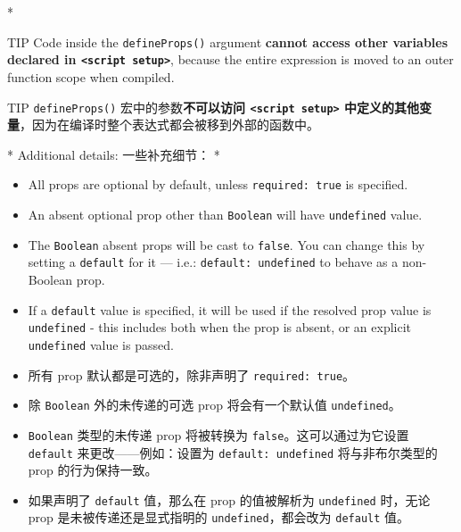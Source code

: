 \begin{paracol}{2}

\switchcolumn[0]*%
\begin{vueQuote}{TIP}
Code inside the \texttt{defineProps()} argument \textbf{cannot access
other variables declared in
\texttt{\textless{}script\ setup\textgreater{}}}, because the entire
expression is moved to an outer function scope when compiled.
\end{vueQuote}
\switchcolumn
\begin{vueQuote}{TIP}
\texttt{defineProps()} 宏中的参数\textbf{不可以访问
\texttt{\textless{}script\ setup\textgreater{}}
中定义的其他变量}，因为在编译时整个表达式都会被移到外部的函数中。
\end{vueQuote}
\switchcolumn[0]*%
Additional details:
\switchcolumn
一些补充细节：
\switchcolumn[0]*%
\begin{itemize}
\item
    All props are optional by default, unless \texttt{required:\ true} is
    specified.
\item
    An absent optional prop other than \texttt{Boolean} will have
    \texttt{undefined} value.
\item
    The \texttt{Boolean} absent props will be cast to \texttt{false}. You
    can change this by setting a \texttt{default} for it --- i.e.:
    \texttt{default:\ undefined} to behave as a non-Boolean prop.
\item
    If a \texttt{default} value is specified, it will be used if the
    resolved prop value is \texttt{undefined} - this includes both when
    the prop is absent, or an explicit \texttt{undefined} value is passed.
\end{itemize}
\switchcolumn
\begin{itemize}
\item
    所有 prop 默认都是可选的，除非声明了 \texttt{required:\ true}。
\item
    除 \texttt{Boolean} 外的未传递的可选 prop 将会有一个默认值
    \texttt{undefined}。
\item
    \texttt{Boolean} 类型的未传递 prop 将被转换为
    \texttt{false}。这可以通过为它设置 \texttt{default}
    来更改------例如：设置为 \texttt{default:\ undefined} 将与非布尔类型的
    prop 的行为保持一致。
\item
    如果声明了 \texttt{default} 值，那么在 prop 的值被解析为
    \texttt{undefined} 时，无论 prop 是未被传递还是显式指明的
    \texttt{undefined}，都会改为 \texttt{default} 值。
\end{itemize}



\end{paracol}
